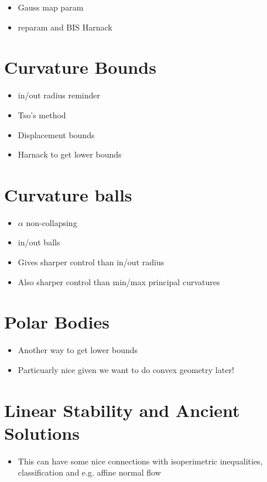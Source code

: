 \begin{itemize}
\item Gauss map param
\item reparam and BIS Harnack
\end{itemize}

\section{Curvature Bounds}

\begin{itemize}
\item in/out radius reminder
\item Tso's method
\item Displacement bounds
\item Harnack to get lower bounds
\end{itemize}

\section{Curvature balls}

\begin{itemize}
\item \(\alpha\) non-collapsing
\item in/out balls
\item Gives sharper control than in/out radius
\item Also sharper control than min/max principal curvatures
\end{itemize}

\section{Polar Bodies}

\begin{itemize}
\item Another way to get lower bounds
\item Particuarly nice given we want to do convex geometry later!
\end{itemize}

\section{Linear Stability and Ancient Solutions}

\begin{itemize}
\item This can have some nice connections with isoperimetric inequalities, classification and e.g. affine normal flow
\end{itemize}

